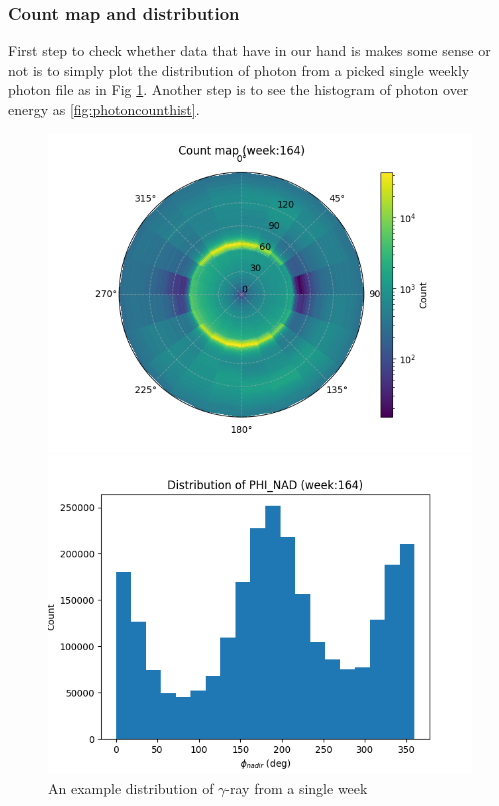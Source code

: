\subsubsection*{Count map and distribution}

First step to check whether data that have in our hand is makes some sense or not is to simply plot the distribution of photon from a picked single weekly photon file 
as in Fig \ref{fig:exphotondist}. Another step is to see the histogram of photon over energy as \ref{fig:photoncounthist}.

\begin{figure}
    \centering
    \begin{minipage}[b]{0.45\textwidth}
        \centering
        \includegraphics[width=\textwidth]{img/cntmap_polar}
    \end{minipage}
    \begin{minipage}[b]{0.45\textwidth}
        \centering
        \includegraphics[width=\textwidth]{img/phi_nad_dist}
    \end{minipage}
    \caption{An example distribution of $\gamma$-ray from a single week}
    \label{fig:exphotondist}
\end{figure}


